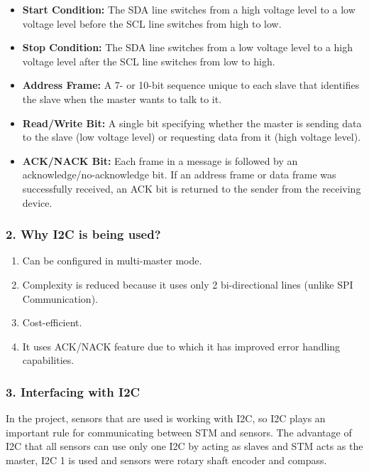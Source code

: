 \begin{itemize}
    \item \textbf{Start Condition: } The SDA line switches from a high voltage level to a low voltage level before the SCL line switches from high to low.
    \item \textbf{Stop Condition: } The SDA line switches from a low voltage level to a high voltage level after the SCL line switches from low to high. 
    \item \textbf{Address Frame: }  A 7- or 10-bit sequence unique to each slave that identifies the slave when the master wants to talk to it. 
    \item \textbf{Read/Write Bit: }  A single bit specifying whether the master is sending data to the slave (low voltage level) or requesting data from it (high voltage level). 
    \item \textbf{ACK/NACK Bit: } Each frame in a message is followed by an acknowledge/no-acknowledge bit. If an address frame or data frame was successfully received, an ACK bit is returned to the sender from the receiving device. 
\end{itemize}

\subsubsection{2. Why I2C is being used?}
\begin{enumerate}
    \item Can be configured in multi-master mode.
    \item Complexity is reduced because it uses only 2 bi-directional lines (unlike SPI Communication).
    \item Cost-efficient.
    \item It uses ACK/NACK feature due to which it has improved error handling capabilities.
\end{enumerate}

\subsubsection{3. Interfacing with I2C}
In the project, sensors that are used is working with I2C, so I2C plays an important rule for communicating between STM and sensors. \newline
The advantage of I2C that all sensors can use only one I2C by acting as slaves and STM acts as the master, I2C 1 is used and sensors were rotary shaft encoder and compass. \newline

